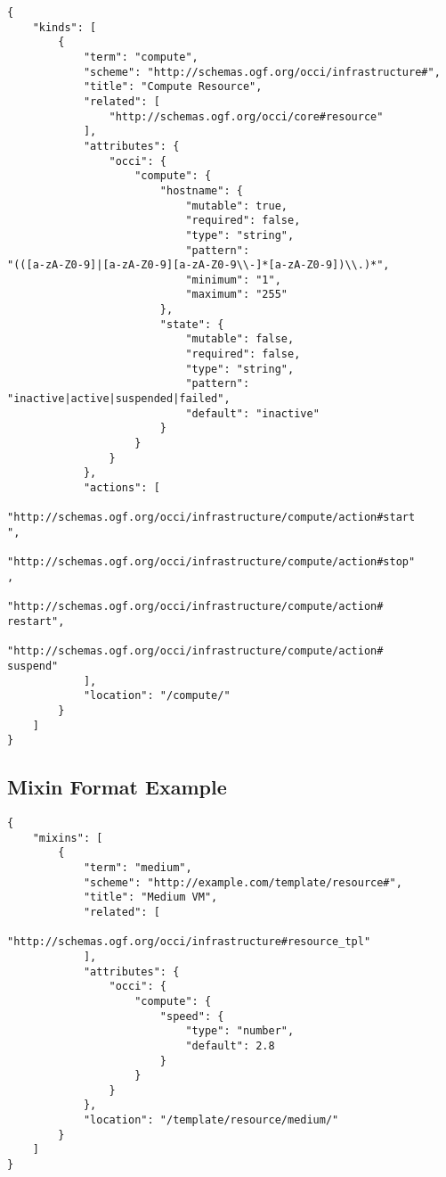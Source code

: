 \documentclass[10pt,a4paper]{article}
\begin{document}
\begin{verbatim}
{
    "kinds": [
        {
            "term": "compute",
            "scheme": "http://schemas.ogf.org/occi/infrastructure#",
            "title": "Compute Resource",
            "related": [
                "http://schemas.ogf.org/occi/core#resource"
            ],
            "attributes": {
                "occi": {
                    "compute": {
                        "hostname": {
                            "mutable": true,
                            "required": false,
                            "type": "string",
                            "pattern":
"(([a-zA-Z0-9]|[a-zA-Z0-9][a-zA-Z0-9\\-]*[a-zA-Z0-9])\\.)*",
                            "minimum": "1",
                            "maximum": "255"
                        },
                        "state": {
                            "mutable": false,
                            "required": false,
                            "type": "string",
                            "pattern": "inactive|active|suspended|failed",
                            "default": "inactive"
                        }
                    }
                }
            },
            "actions": [
                "http://schemas.ogf.org/occi/infrastructure/compute/action#start
",
                "http://schemas.ogf.org/occi/infrastructure/compute/action#stop"
,
                "http://schemas.ogf.org/occi/infrastructure/compute/action#
restart",
                "http://schemas.ogf.org/occi/infrastructure/compute/action#
suspend"
            ],
            "location": "/compute/"
        }
    ]
}
\end{verbatim}

\subsection{Mixin Format Example}
\label{sec:example_mixin}

\begin{verbatim}
{
    "mixins": [
        {
            "term": "medium",
            "scheme": "http://example.com/template/resource#",
            "title": "Medium VM",
            "related": [
                "http://schemas.ogf.org/occi/infrastructure#resource_tpl"
            ],
            "attributes": {
                "occi": {
                    "compute": {
                        "speed": {
                            "type": "number",
                            "default": 2.8
                        }
                    }
                }
            },
            "location": "/template/resource/medium/"
        }
    ]
}
\end{verbatim}
\end{document}
